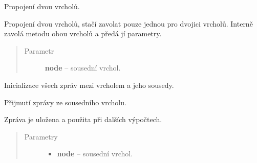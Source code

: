 \begin{fulllineitems}
\begin{fulllineitems}
\begin{quote}
\begin{description}
\end{description}\end{quote}

\end{fulllineitems}


\begin{fulllineitems}
\label{alex.infer:alex.infer.factor.alex.infer.node.DirichletFactorNode.connect}
Propojení dvou vrcholů.

Propojení dvou vrcholů, stačí zavolat pouze jednou pro dvojici vrcholů.
Interně zavolá metodu {\hyperref[alex.infer:alex.infer.factor.alex.infer.node.DirichletFactorNode.add_neighbor]{}} obou vrcholů a předá jí parametry.
\begin{quote}\begin{description}
\item[{Parametr}] \leavevmode
\textbf{node} -- sousední vrchol.

\end{description}\end{quote}

\end{fulllineitems}


\begin{fulllineitems}
\label{alex.infer:alex.infer.factor.alex.infer.node.DirichletFactorNode.init_messages}
Inicializace všech zpráv mezi vrcholem a jeho sousedy.

\end{fulllineitems}


\begin{fulllineitems}
\label{alex.infer:alex.infer.factor.alex.infer.node.DirichletFactorNode.message_from}
Přijmutí zprávy ze sousedního vrcholu.

Zpráva je uložena a použita při dalších výpočtech.
\begin{quote}\begin{description}
\item[{Parametry}] \leavevmode\begin{itemize}
\item {} 
\textbf{node} -- sousední vrchol.


\end{itemize}
\end{description}
\end{quote}
\end{fulllineitems}
\end{fulllineitems}
